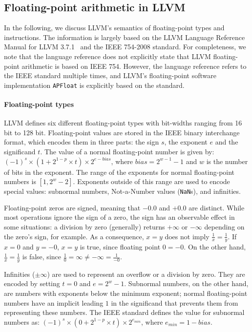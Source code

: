 \documentclass[preprint, numbers]{sigplanconf}
\begin{document}
\subsection{Floating-point arithmetic in LLVM} \label{sec:fpllvm}

In the following, we discuss LLVM's semantics of floating-point types and
instructions. The information is largely based on the LLVM Language Reference
Manual for LLVM 3.7.1~\cite{llvm-lang-ref} and the IEEE 754-2008 standard. For
completeness, we note that the language reference does not explicitly state
that LLVM floating-point arithmetic is based on IEEE 754. However, the language
reference refers to the IEEE standard multiple times, and LLVM's floating-point software
implementation \texttt{APFloat} is explicitly based on the standard.

\paragraph{Floating-point types} LLVM defines six different floating-point
types with bit-widths ranging from 16 bit to 128 bit. Floating-point values are
stored in the IEEE binary interchange format, which encodes them in three
parts: the sign $s$, the exponent $e$ and the significand $t$. The value of a
normal floating-point number is given by: $(-1)^s \times (1 + 2^{1-p} \times t)
\times 2^{e - bias}$, where $bias = 2^{w - 1} - 1$ and $w$ is the number of
bits in the exponent. The range of the exponents for normal floating-point
numbers is $[1, 2^w-2]$. Exponents outside of this range are used to encode
special values: subnormal numbers, Not-a-Number values (\texttt{NaN}s), and
infinities.

Floating-point zeros are signed, meaning that $-0.0$ and $+0.0$ are distinct.
While most operations ignore the sign of a zero, the sign has an observable
effect in some situations: a division by zero (generally) returns $+\infty$ or
$-\infty$ depending on the zero's sign, for example. As a consequence, $x = y$
does not imply $\frac{1}{x} = \frac{1}{y}$. If $x = 0$ and $y = -0$, $x = y$ is
true, since floating point $0 = -0$. On the other hand, $\frac{1}{x} =
\frac{1}{y}$ is false, since $\frac{1}{0} = \infty \neq -\infty =
\frac{1}{-0}$.

Infinities ($\pm\infty$) are used to represent an overflow or a division by
zero. They are encoded by setting $t = 0$ and $e = 2^w - 1$. Subnormal numbers,
on the other hand, are numbers with exponents below the minimum exponent;
normal floating-point numbers have an implicit leading $1$ in the significand
that prevents them from representing these numbers.  The IEEE standard defines
the value for subnormal numbers as: $(-1)^s \times (0 + 2^{1-p} \times t)
\times 2^{e_{min}}$, where $e_{min} = 1 - bias$.
\end{document}
